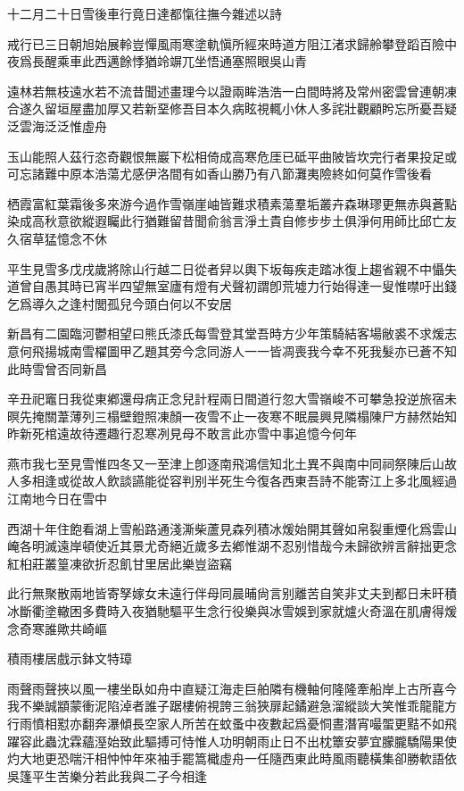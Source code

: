 \documentclass{zhvt-classic-Miya}
\begin{document}
\begin{fw}十二月二十日雪後車行竟日達都愾往撫今雜述以詩\end{fw}

戒行已三日朝旭始展軨豈憚風雨寒塗軌愼所經來時道方阻江渚求歸舲攀登蹈百險中夜爲長醒乘車此西邁餘悸猶竛竮兀坐悟通塞照眼吳山青

遠林若無枝遠水若不流昔聞述畫理今以證兩眸浩浩一白間時將及常州密雲曾連朝凍合遂久留垣屋盡加厚又若新堊修吾目本久病眩視輒小休人多詫壯觀顧盻忘所憂吾疑泛雲海泛泛惟虛舟

玉山能照人茲行恣奇觀恨無巖下松相倚成高寒危厓已砥平曲陂皆坎完行者果投足或可忘諸難中原本浩蕩尤感伊洛間有如香山勝乃有八節灘夷險終如何莫作雪後看

栖霞富紅葉霜後多來游今過作雪嶺崖岫皆難求積素蕩羣垢叢卉森琳璆更無赤與蒼點染成高秋意欲縱遐矚此行猶難留昔聞俞翁言淨土貴自修步步土俱淨何用師比邱亡友久宿草猛憶念不休

平生見雪多戊戌歲將除山行越二日從者舁以輿下坂每疾走踏冰復上趨省親不中懾失道曾自愚其時已宵半四望無室廬有燈有犬聲初謂卽荒墟力行始得達一叟惟噤吁出錢乞爲導久之逢村閭孤兒今頭白何以不安居

新昌有二園臨河鬱相望曰熊氏漆氏每雪登其堂吾時方少年策騎結客場敝裘不求煖志意何飛揚城南雪櫂圖甲乙題其旁今念同游人一一皆凋喪我今幸不死我髮亦已蒼不知此時雪曾否同新昌

辛丑祀竈日我從東鄕還母病正念兒計程兩日間道行忽大雪嶺峻不可攀急投逆旅宿未暝先掩關葦薄列三榻壁鐙照凍顏一夜雪不止一夜寒不眠晨興見隣榻陳尸方赫然始知昨新死棺遠故待遷趣行忍寒冽見母不敢言此亦雪中事追憶今何年

燕市我七至見雪惟四冬又一至津上卽逐南飛鴻信知北土異不與南中同祠祭陳后山故人多相逢或從故人飲談讌能從容判别半死生今復各西東吾詩不能寄江上多北風經過江南地今日在雪中

西湖十年住飽看湖上雪船路通淺澌柴蘆見森列積冰煖始開其聲如帛裂重煙化爲雲山崦各明滅遠岸頓使近其景尤奇絕近歲多去鄕惟湖不忍别惜哉今未歸欲辨言辭拙更念紅桕莊叢篁凍欲折忍飢甘里居此樂豈盜竊

此行無聚散兩地皆寄孥嫁女未遠行伴母同晨晡尙言别離苦自笑非丈夫到都日未旰積冰斷衢塗轍困多費時入夜猶馳驅平生念行役樂與冰雪娛到家就爐火奇溫在肌膚得煖念奇寒誰歟共崎嶇

\begin{fw}積雨樓居戲示鉢文特璋\end{fw}

雨聲雨聲挾以風一樓坐臥如舟中直疑江海走巨舶隣有機軸何隆隆牽船岸上古所喜今我不樂誠顓蒙衝泥陷淖者誰子踞樓俯視誇三翁狹扉起鐍避急溜縱談大笑惟乖龍龍方行雨憤相懟亦翻奔瀑傾長空家人所苦在蚊蚤中夜數起爲憂恫晝潛宵嘬蜰更黠不如飛躍容此蟲沈霖蘊溼始致此驅搏可恃惟人功明朝雨止日不出枕簟安夢宜朦朧驕陽果使灼大地更恐喘汗相忡忡年來袖手罷篙檝虛舟一任隨西東此時風雨聽橫集卻勝軟語依吳篷平生苦樂分若此我與二子今相逢
\end{document}
